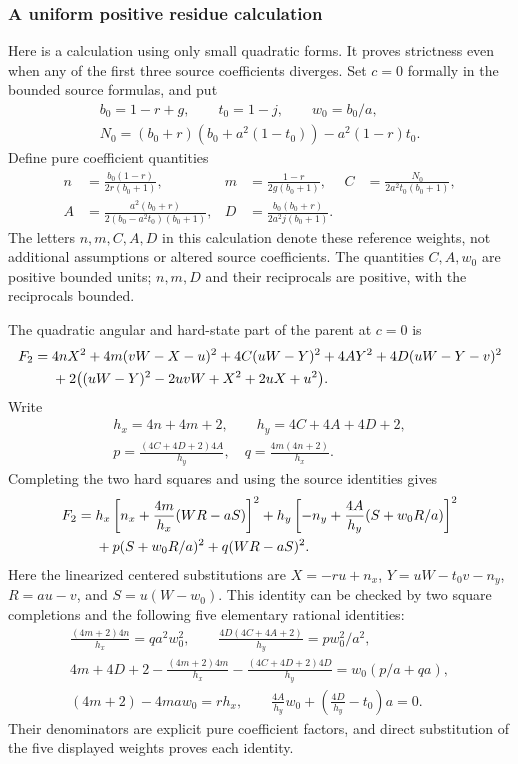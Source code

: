 \subsubsection*{A uniform positive residue calculation}
Here is a calculation using only small quadratic forms.  It proves
strictness even when any of the first three source coefficients diverges.
Set $c=0$ formally in the bounded source formulas, and put
\[
\begin{gathered}
b_0=1-r+g,\qquad t_0=1-j,\qquad w_0=b_0/a,\\
N_0=(b_0+r)(b_0+a^2(1-t_0))-a^2(1-r)t_0.
\end{gathered}
\]
Define pure coefficient quantities
\begin{align*}
n&=\frac{b_0(1-r)}{2r(b_0+1)},&
m&=\frac{1-r}{2g(b_0+1)},&
C&=\frac{N_0}{2a^2t_0(b_0+1)},\\
A&=\frac{a^2(b_0+r)}{2(b_0-a^2t_0)(b_0+1)},&
D&=\frac{b_0(b_0+r)}{2a^2j(b_0+1)}.
\end{align*}
The letters $n,m,C,A,D$ in this calculation denote these reference
weights, not additional assumptions or altered source coefficients.
The quantities $C,A,w_0$ are positive bounded units; $n,m,D$ and their
reciprocals are positive, with the reciprocals bounded.

The quadratic angular and hard-state part of the parent at $c=0$ is
\begin{align}
F_2={}&4nX^2+4m(vW-X-u)^2+4C(uW-Y)^2
 +4AY^2+4D(uW-Y-v)^2\notag\\
&+2\bigl((uW-Y)^2-2uvW+X^2+2uX+u^2\bigr).
\label{p9f1235511111:eq:c2u-F2}
\end{align}
Write
\[
\begin{gathered}
h_x=4n+4m+2,\qquad h_y=4C+4A+4D+2,\\
p=\frac{(4C+4D+2)4A}{h_y},\quad
q=\frac{4m(4n+2)}{h_x}.
\end{gathered}
\]
Completing the two hard squares and using the source identities gives
\begin{align}
F_2={}&h_x\left[n_x+\frac{4m}{h_x}(WR-aS)\right]^2
 +h_y\left[-n_y+\frac{4A}{h_y}(S+w_0R/a)\right]^2\notag\\
&+p(S+w_0R/a)^2+q(WR-aS)^2.
\label{p9f1235511111:eq:c2u-F2-factor}
\end{align}
Here the linearized centered substitutions are
$X=-ru+n_x$, $Y=uW-t_0v-n_y$,
$R=au-v$, and $S=u(W-w_0)$.  This identity can be checked by two
square completions and the following five elementary rational identities:
\begin{gather*}
\frac{(4m+2)4n}{h_x}=qa^2w_0^2,\qquad
\frac{4D(4C+4A+2)}{h_y}=p w_0^2/a^2,\\
4m+4D+2-\frac{(4m+2)4m}{h_x}
 -\frac{(4C+4D+2)4D}{h_y}
 =w_0(p/a+qa),\\
(4m+2)-4maw_0=rh_x,\qquad
\frac{4A}{h_y}w_0+\left(\frac{4D}{h_y}-t_0\right)a=0.
\end{gather*}
Their denominators are explicit pure coefficient factors, and direct
substitution of the five displayed weights proves each identity.

